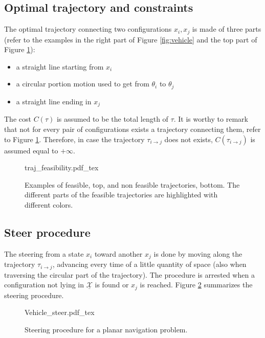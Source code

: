 \subsection{Optimal trajectory and constraints}

The optimal trajectory connecting two configurations $x_i, x_j$ is made of three parts (refer to the examples in the right part of Figure \ref{fig:vehicle} and the top part of Figure \ref{fig:traj_feas}):
\begin{itemize}
\item a straight line starting from $x_i$
\item a circular portion motion used to get from $\theta_i$ to $\theta_j$
\item a straight line ending in $x_j$
\end{itemize}
The cost $C(\tau)$ is assumed to be the total length of $\tau$. It is worthy to remark that not for every pair of configurations exists a trajectory connecting them, refer to Figure \ref{fig:traj_feas}. Therefore, in case the trajectory $\tau_{i \rightarrow j}$ does not exists, $C(\tau_{i \rightarrow j})$ is assumed equal to $+\infty$.

 \begin{figure}
	 \centering
 \def\svgwidth{0.65 \columnwidth}
 {traj_feasibility.pdf_tex} 
	 \caption{Examples of feasible, top, and non feasible trajectories, bottom. The different parts of the feasible trajectories are highlighted with different colors. }
 \label{fig:traj_feas}
 \end{figure}

\subsection{Steer procedure}

The steering from a state $x_i$ toward another $x_j$ is done by moving along the trajectory $\tau_{i \rightarrow j}$, advancing every time of a little quantity of space (also when traversing the circular part of the trajectory).
The procedure is arrested when a configuration not lying in $\underline{\mathcal{X}}$ is found or $x_j$ is reached. Figure \ref{fig:vehicle_steer} summarizes the steering procedure.

 \begin{figure}
	 \centering
 \def\svgwidth{0.35 \columnwidth}
 {Vehicle_steer.pdf_tex} 
	 \caption{Steering procedure for a planar navigation problem.}
 \label{fig:vehicle_steer}
 \end{figure}

